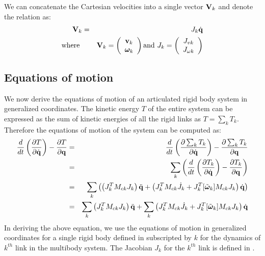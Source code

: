 We can concatenate the Cartesian velocities into a single vector $\mathbf{V}_k$ and denote the relation as:
\begin{eqnarray}
\label{eq:vel_relation_link}
\nonumber
\mathbf{V}_k & = & {J}_k \dot{\mathbf{q}}\\
\mbox{where } & & 
\mathbf{V}_k = \left (
\begin{array}{c}
\mathbf{v}_k\\
\bm{\omega}_k
\end{array}
\right ) \mbox{and\ }
{J}_k = \left (
\begin{array}{c}
J_{vk}\\
J_{\omega k}
\end{array}
\right ) 
\end{eqnarray}


\subsection{Equations of motion}
We now derive the equations of motion of an articulated rigid body system in generalized coordinates. The kinetic energy $T$ of the entire system can be expressed as the sum of kinetic energies of all the rigid links as $T=\sum_k T_k$. Therefore the equations of motion of the system can be computed as:
\begin{eqnarray}
\nonumber
\frac{d}{dt} \left ( \frac{\partial T}{\partial \dot{\mathbf{q}}} \right ) - \frac{\partial T}{\partial \mathbf{q}} & = & \frac{d}{dt} \left ( \frac{\partial \sum_k T_k}{\partial \dot{\mathbf{q}}} \right ) - \frac{\partial \sum_k T_k}{\partial \mathbf{q}}\\
\nonumber
& = & \sum_k \left ( \frac{d}{dt} \left ( \frac{\partial T_k}{\partial \dot{\mathbf{q}}} \right ) - \frac{\partial T_k}{\partial \mathbf{q}} \right )\\
\nonumber
& = & \sum_k \left ( \left( J_k^T M_{ck} J_k \right )\ddot{\mathbf{q}} + \left( J_k^T M_{ck} \dot{J}_k + J_k^T [\tilde{\bm{\omega}}_k]M_{ck} J_k \right )\dot{\mathbf{q}} \right )\\
& = &  \sum_k \left( J_k^T M_{ck} J_k \right )\ddot{\mathbf{q}} + \sum_k\left( J_k^T M_{ck} \dot{J}_k + J_k^T [\tilde{\bm{\omega}}_k]M_{ck} J_k \right )\dot{\mathbf{q}}
\end{eqnarray}
In deriving the above equation, we use the equations of motion in generalized coordinates for a single rigid body defined in  subscripted by $k$ for the dynamics of $k^{th}$ link in the multibody system. The Jacobian $J_k$ for the $k^{th}$ link is defined in .




